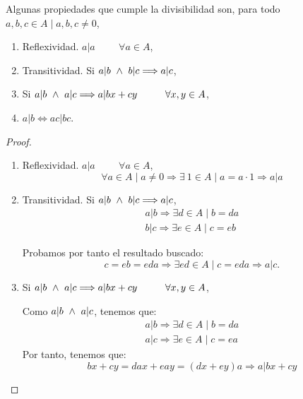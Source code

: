 \begin{prop}
    Algunas propiedades que cumple la divisibilidad son, para todo $a,b,c \in A \mid a,b,c \neq 0$,
    \begin{enumerate}
        \item Reflexividad. $a|a\hspace{1cm}\forall a \in A$,
        \item Transitividad. Si $a|b \ \land \  b|c \Longrightarrow a|c$,
        \item Si $a|b \ \land \  a|c \Longrightarrow a|bx+cy\hspace{1cm}\forall x,y \in A$,
        \item $a|b \Longleftrightarrow ac|bc$.
    \end{enumerate}
\end{prop}
\begin{proof}\
    \begin{enumerate}
        \item Reflexividad. $a|a\hspace{1cm}\forall a \in A$,
        $$\forall a \in A \mid a \neq 0 \Longrightarrow \exists \ 1 \in A \mid a = a \cdot 1 \Longrightarrow a|a$$
        
        \item Transitividad. Si $a|b \ \land \  b|c \Longrightarrow a|c$,
        \begin{gather*}
            a|b \Longrightarrow \exists d \in A \mid b = da\\
            b|c \Longrightarrow \exists e \in A \mid c = eb
        \end{gather*}

        Probamos por tanto el resultado buscado:
        $$c = eb = eda \Longrightarrow \exists ed \in A \mid c = eda \Longrightarrow a|c.$$
        
        \item Si $a|b \ \land \  a|c \Longrightarrow a|bx+cy\hspace{1cm}\forall x,y \in A$,

        Como $a|b \ \land \  a|c$, tenemos que:
        \begin{gather*}
            a|b \Longrightarrow \exists d \in A \mid b = da \\
            a|c \Longrightarrow \exists e \in A \mid c = ea
        \end{gather*}
        Por tanto, tenemos que:
        $$bx+cy = dax + eay = (dx+ey)a \Longrightarrow a|bx+cy$$
        

\end{enumerate}
\end{proof}
